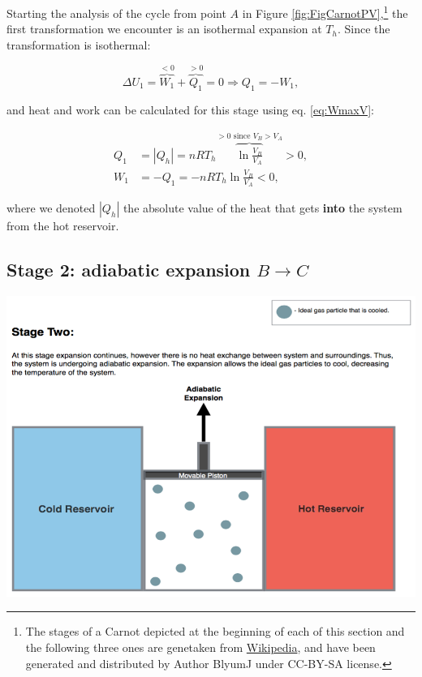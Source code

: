 \documentclass[
  9pt,
]{extbook}
\theoremstyle{definition}
\theoremstyle{definition}
\theoremstyle{definition}
\theoremstyle{remark}
\begin{document}
Starting the analysis of the cycle from point \(A\) in Figure \ref{fig:FigCarnotPV},\footnote{The stages of a Carnot depicted at the beginning of each of this section and the following three ones are genetaken from \href{https://en.wikipedia.org/wiki/Carnot_cycle}{Wikipedia}, and have been generated and distributed by Author BlyumJ under CC-BY-SA license.} the first transformation we encounter is an isothermal expansion at \(T_h\). Since the transformation is isothermal:

\begin{equation}
\Delta U_1 = \overbrace{W_1}^{<0} + \overbrace{Q_1}^{>0} = 0 \Rightarrow Q_1 = -W_1,
  \label{eq:CCst1}
\end{equation}

and heat and work can be calculated for this stage using eq. \eqref{eq:WmaxV}:

\begin{equation}
\begin{aligned}
 Q_1 & = \left| Q_h \right|  = nRT_h \overbrace{\ln \frac{V_B}{V_A}}^{>0 \text{ since } V_B>V_A} > 0, \\
 W_1 & = -Q_1 = - nRT_h \ln \frac{V_B}{V_A} < 0,
\end{aligned}
  \label{eq:CCst1b}
\end{equation}

where we denoted \(\left| Q_h \right|\) the absolute value of the heat that gets \textbf{into} the system from the hot reservoir.

\hypertarget{CCstage2}{%
\subsection{\texorpdfstring{Stage 2: adiabatic expansion \(B \rightarrow C\)}{Stage 2: adiabatic expansion B \textbackslash rightarrow C}}\label{CCstage2}}

\begin{center}\includegraphics[width=0.7\linewidth]{./img/OEP_Figures.007b} \end{center}
\end{document}
